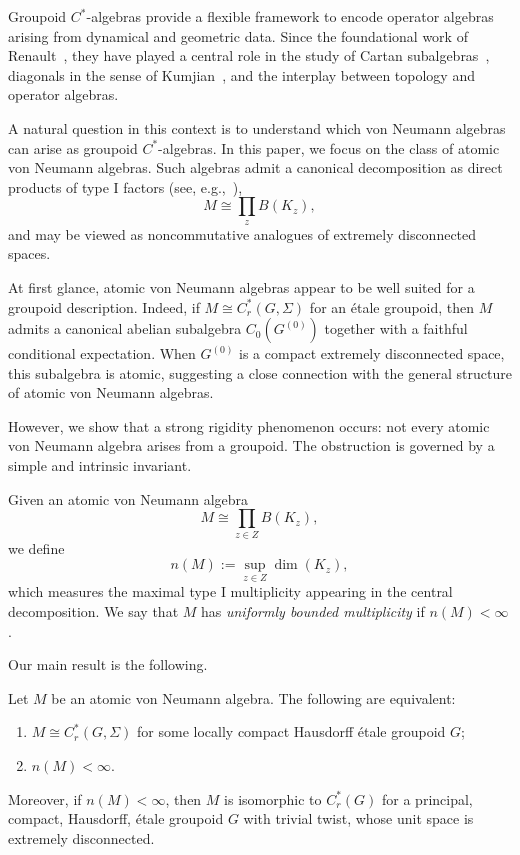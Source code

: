 Groupoid $C^*$-algebras provide a flexible framework to encode operator algebras arising from dynamical and geometric data. Since the foundational work of Renault~\cite{Renault1980}, they have played a central role in the study of Cartan subalgebras~\cite{Renault2008,Raad22}, diagonals in the sense of Kumjian~\cite{Kumjian1986}, and the interplay between topology and operator algebras.

A natural question in this context is to understand which von Neumann algebras can arise as groupoid $C^*$-algebras. In this paper, we focus on the class of atomic von Neumann algebras. Such algebras admit a canonical decomposition as direct products of type I factors (see, e.g.,~\cite{Sakai1971,TakesakiI}),
\[
M \cong \prod_{z} B(K_z),
\]
and may be viewed as noncommutative analogues of extremely disconnected spaces.

At first glance, atomic von Neumann algebras appear to be well suited for a groupoid description. Indeed, if $M \cong C_r^*(G,\Sigma)$ for an étale groupoid, then $M$ admits a canonical abelian subalgebra $C_0(G^{(0)})$ together with a faithful conditional expectation. When $G^{(0)}$ is a compact extremely disconnected space, this subalgebra is atomic, suggesting a close connection with the general structure of atomic von Neumann algebras.

However, we show that a strong rigidity phenomenon occurs: not every atomic von Neumann algebra arises from a groupoid. The obstruction is governed by a simple and intrinsic invariant.

\medskip

Given an atomic von Neumann algebra
\[
M \cong \prod_{z \in Z} B(K_z),
\]
we define
\[
n(M) := \sup_{z \in Z} \dim(K_z),
\]
which measures the maximal type I multiplicity appearing in the central decomposition. We say that $M$ has \emph{uniformly bounded multiplicity} if $n(M) < \infty$.

Our main result is the following.

\begin{theorem}
Let $M$ be an atomic von Neumann algebra. The following are equivalent:
\begin{enumerate}
\item $M \cong C_r^*(G,\Sigma)$ for some locally compact Hausdorff étale groupoid $G$;
\item $n(M) < \infty$.
\end{enumerate}

Moreover, if $n(M) < \infty$, then $M$ is isomorphic to $C_r^*(G)$ for a principal, compact, Hausdorff, étale groupoid $G$ with trivial twist, whose unit space is extremely disconnected.
\end{theorem}

